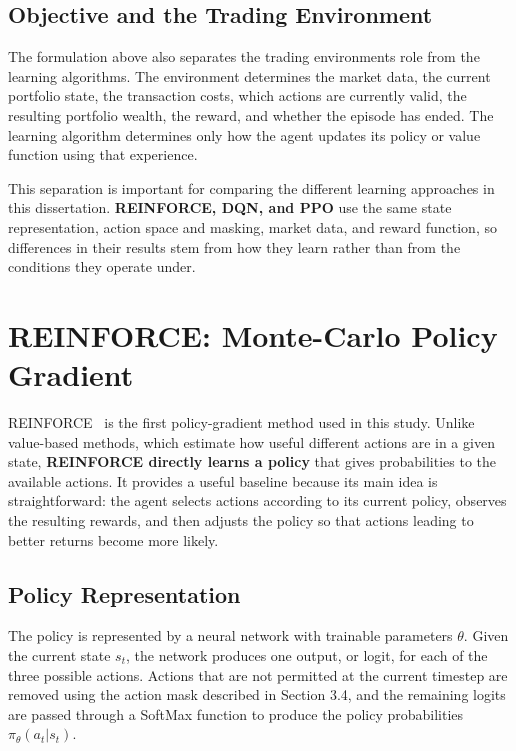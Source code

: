 \subsection{Objective and the Trading Environment}

The formulation above also separates the trading
environment\textquotesingle s role from the learning
algorithm\textquotesingle s. The environment determines the market data,
the current portfolio state, the transaction costs, which actions are
currently valid, the resulting portfolio wealth, the reward, and whether
the episode has ended. The learning algorithm determines only how the
agent updates its policy or value function using that experience.

This separation is important for comparing the different learning
approaches in this dissertation. \textbf{REINFORCE, DQN, and PPO} use
the same state representation, action space and masking, market data,
and reward function, so differences in their results stem from how they
learn rather than from the conditions they operate under.

\section{REINFORCE: Monte-Carlo Policy Gradient}

REINFORCE~\cite{williams1992} is the first policy-gradient method used
in this study. Unlike value-based methods, which estimate how useful
different actions are in a given state, \textbf{REINFORCE directly
learns a policy} that gives probabilities to the available actions. It
provides a useful baseline because its main idea is straightforward: the
agent selects actions according to its current policy, observes the
resulting rewards, and then adjusts the policy so that actions leading
to better returns become more likely.

\subsection{Policy Representation}

The policy is represented by a neural network with trainable parameters
\(\theta\). Given the current state \(s_{t}\), the network produces one
output, or logit, for each of the three possible actions. Actions that
are not permitted at the current timestep are removed using the action
mask described in Section 3.4, and the remaining logits are passed
through a SoftMax function to produce the policy probabilities
\(\pi_{\theta}\left( a_{t}|s_{t} \right)\).

